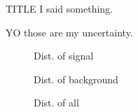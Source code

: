 \documentclass{article}
\begin{document}
\begin{section}{TITLE}
    I said something.
    \begin{table}[h]
        \centering
        
        \caption{YO those are my uncertainty.}
        \label{tab:test_uncertainty}
    \end{table}
    \begin{figure}[h]
        
        \caption{Dist. of signal}
        \label{fig:signal}
    \end{figure}
    \begin{figure}[h]
        
        \caption{Dist. of background}
        \label{fig:background}
    \end{figure}
    \begin{figure}[h]
        
        \caption{Dist. of all}
        \label{fig:all}
    \end{figure}
\end{section}
\end{document}
